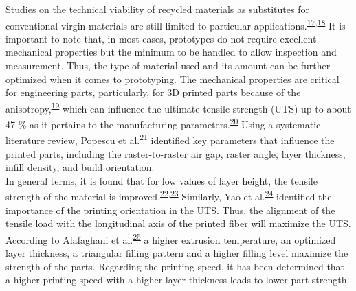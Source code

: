 \documentclass[
  12pt]{article}
\begin{document}
Studies on the technical viability of recycled materials as substitutes for conventional virgin materials are still limited to particular applications.\textsuperscript{\protect\hyperlink{ref-CruzSanchez2020}{17},\protect\hyperlink{ref-Mikula2020}{18}}
It is important to note that, in most cases, prototypes do not require excellent mechanical properties but the minimum to be handled to allow inspection and measurement.
Thus, the type of material used and its amount can be further optimized when it comes to prototyping.
The mechanical properties are critical for engineering parts, particularly, for 3D printed parts because of the anisotropy,\textsuperscript{\protect\hyperlink{ref-Lovo2018}{19}} which can influence the ultimate tensile strength (UTS) up to about 47 \% as it pertains to the manufacturing parameters.\textsuperscript{\protect\hyperlink{ref-Laureto2018}{20}}
Using a systematic literature review, Popescu et al.\textsuperscript{\protect\hyperlink{ref-Popescu2018}{21}} identified key parameters that influence the printed parts, including the raster-to-raster air gap, raster angle, layer thickness, infill density, and build orientation.\\
In general terms, it is found that for low values of layer height, the tensile strength of the material is improved.\textsuperscript{\protect\hyperlink{ref-Tymrak2014a}{22},\protect\hyperlink{ref-Altan2018}{23}}
Similarly, Yao et al.\textsuperscript{\protect\hyperlink{ref-Yao2019}{24}} identified the importance of the printing orientation in the UTS. Thus, the alignment of the tensile load with the longitudinal axis of the printed fiber will maximize the UTS.
According to Alafaghani et al.\textsuperscript{\protect\hyperlink{ref-Alafaghani2018}{25}} a higher extrusion temperature, an optimized layer thickness, a triangular filling pattern and a higher filling level maximize the strength of the parts. Regarding the printing speed, it has been determined that a higher printing speed with a higher layer thickness leads to lower part strength.
\end{document}
